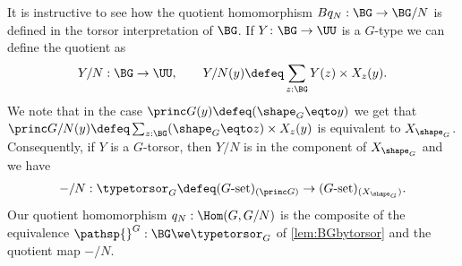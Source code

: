 \begin{remark}
It is instructive to see how the quotient homomorphism $Bq_N:\BG\to \BG/N$ is defined in the torsor interpretation of $\BG$.  If $Y\colon \BG\to\UU$ is a $G$-type we can define the quotient as
$$
Y/N:\BG\to\UU,\qquad Y/N(y)\defeq\sum_{z:\BG}Y(z)\times X_z(y).
$$
We note that in the case $\princ G(y)\defeq (\sh_G\eqto y)$ we get
that
$
\princ G /N(y)\defeq\sum_{z:\BG}(\sh_G\eqto z)\times X_z(y)
$
is equivalent to $X_{\sh_G}$.  Consequently, if $Y$ is a $G$-torsor, then $Y/N$ is in the component of $X_{\sh_G}$ and we have
$$-/N:\typetorsor_G\defeq (G\text{-set})_{(\princ G)}\to (G\text{-set})_{(X_{\sh_G})}.
$$ Our quotient homomorphism $q_N:\Hom(G,G/N)$ is the composite of the equivalence $\pathsp{}^G:\BG\we\typetorsor_G$ of \cref{lem:BGbytorsor} and the quotient map $-/N$.
\end{remark}

